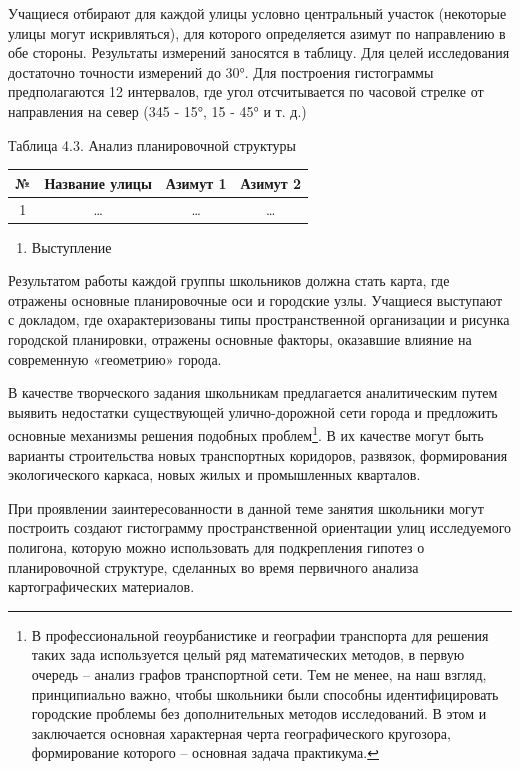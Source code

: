 \documentclass[
  11pt,
  russian,
]{book}
\providecommand{\tightlist}{%
  \setlength{\itemsep}{0pt}\setlength{\parskip}{0pt}}
\begin{document}
Учащиеся отбирают для каждой улицы условно центральный участок (некоторые улицы могут искривляться), для которого определяется азимут по направлению в обе стороны. Результаты измерений заносятся в таблицу. Для целей исследования достаточно точности измерений до 30°. Для построения гистограммы предполагаются 12 интервалов, где угол отсчитывается по часовой стрелке от направления на север (345 - 15°, 15 - 45° и т. д.)

Таблица 4.3. Анализ планировочной структуры

\begin{longtable}[]{@{}cccc@{}}
\toprule
№ & Название улицы & Азимут 1 & Азимут 2 \\
\midrule
\endhead
1 & \ldots{} & \ldots{} & \ldots{} \\
\bottomrule
\end{longtable}

\begin{enumerate}
\def\labelenumi{\arabic{enumi}.}
\setcounter{enumi}{2}
\tightlist
\item
  Выступление
\end{enumerate}

Результатом работы каждой группы школьников должна стать карта, где отражены основные планировочные оси и городские узлы. Учащиеся выступают с докладом, где охарактеризованы типы пространственной организации и рисунка городской
планировки, отражены основные факторы, оказавшие влияние на современную
«геометрию» города.

В качестве творческого задания школьникам предлагается аналитическим путем
выявить недостатки существующей улично-дорожной сети города и предложить
основные механизмы решения подобных проблем\footnote{В профессиональной геоурбанистике и
  географии транспорта для решения таких зада используется целый ряд
  математических методов, в первую очередь -- анализ графов транспортной сети. Тем
  не менее, на наш взгляд, принципиально важно, чтобы школьники были способны
  идентифицировать городские проблемы без дополнительных методов исследований. В
  этом и заключается основная характерная черта географического кругозора, формирование
  которого -- основная задача практикума.}. В их качестве могут быть
варианты строительства новых транспортных коридоров, развязок, формирования
экологического каркаса, новых жилых и промышленных кварталов.

При проявлении заинтересованности в данной теме занятия школьники могут построить создают гистограмму пространственной ориентации улиц исследуемого полигона, которую можно использовать для подкрепления гипотез о планировочной структуре, сделанных во время первичного анализа картографических материалов.
\end{document}
